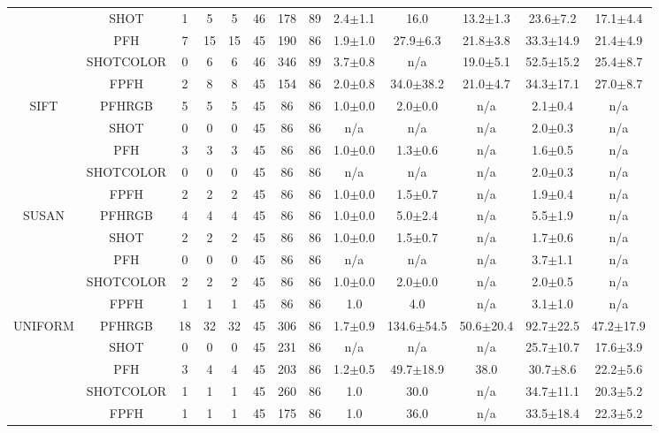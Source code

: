 \documentclass[11pt,a4paper]{kth-mag}
\begin{document}
\begin{landscape}
\begin{table}
\begin{tabular}{cc|ccccccccccc}
      &SHOT & 1 & 5 & 5 & 46 & 178 & 89 & 2.4$\pm$1.1 & 16.0 & 13.2$\pm$1.3 & 23.6$\pm$7.2 & 17.1$\pm$4.4\\
      &PFH & 7 & 15 & 15 & 45 & 190 & 86 & 1.9$\pm$1.0 & 27.9$\pm$6.3 & 21.8$\pm$3.8 & 33.3$\pm$14.9 & 21.4$\pm$4.9\\
      &SHOTCOLOR & 0 & 6 & 6 & 46 & 346 & 89 & 3.7$\pm$0.8 & n/a & 19.0$\pm$5.1 & 52.5$\pm$15.2 & 25.4$\pm$8.7\\
      &FPFH & 2 & 8 & 8 & 45 & 154 & 86 & 2.0$\pm$0.8 & 34.0$\pm$38.2 & 21.0$\pm$4.7 & 34.3$\pm$17.1 & 27.0$\pm$8.7\\
      \hline\multirow{5}{*}{SIFT} & PFHRGB & 5 & 5 & 5 & 45 & 86 & 86 & 1.0$\pm$0.0 & 2.0$\pm$0.0 & n/a & 2.1$\pm$0.4 & n/a\\
      &SHOT & 0 & 0 & 0 & 45 & 86 & 86 & n/a & n/a & n/a & 2.0$\pm$0.3 & n/a\\
      &PFH & 3 & 3 & 3 & 45 & 86 & 86 & 1.0$\pm$0.0 & 1.3$\pm$0.6 & n/a & 1.6$\pm$0.5 & n/a\\
      &SHOTCOLOR & 0 & 0 & 0 & 45 & 86 & 86 & n/a & n/a & n/a & 2.0$\pm$0.3 & n/a\\
      &FPFH & 2 & 2 & 2 & 45 & 86 & 86 & 1.0$\pm$0.0 & 1.5$\pm$0.7 & n/a & 1.9$\pm$0.4 & n/a\\
      \hline\multirow{5}{*}{SUSAN} & PFHRGB & 4 & 4 & 4 & 45 & 86 & 86 & 1.0$\pm$0.0 & 5.0$\pm$2.4 & n/a & 5.5$\pm$1.9 & n/a\\
      &SHOT & 2 & 2 & 2 & 45 & 86 & 86 & 1.0$\pm$0.0 & 1.5$\pm$0.7 & n/a & 1.7$\pm$0.6 & n/a\\
      &PFH & 0 & 0 & 0 & 45 & 86 & 86 & n/a & n/a & n/a & 3.7$\pm$1.1 & n/a\\
      &SHOTCOLOR & 2 & 2 & 2 & 45 & 86 & 86 & 1.0$\pm$0.0 & 2.0$\pm$0.0 & n/a & 2.0$\pm$0.5 & n/a\\
      &FPFH & 1 & 1 & 1 & 45 & 86 & 86 & 1.0 & 4.0 & n/a & 3.1$\pm$1.0 & n/a\\
      \hline\multirow{5}{*}{UNIFORM} & PFHRGB & 18 & 32 & 32 & 45 & 306 & 86 & 1.7$\pm$0.9 & 134.6$\pm$54.5 & 50.6$\pm$20.4 & 92.7$\pm$22.5 & 47.2$\pm$17.9\\
      &SHOT & 0 & 0 & 0 & 45 & 231 & 86 & n/a & n/a & n/a & 25.7$\pm$10.7 & 17.6$\pm$3.9\\
      &PFH & 3 & 4 & 4 & 45 & 203 & 86 & 1.2$\pm$0.5 & 49.7$\pm$18.9 & 38.0 & 30.7$\pm$8.6 & 22.2$\pm$5.6\\
      &SHOTCOLOR & 1 & 1 & 1 & 45 & 260 & 86 & 1.0 & 30.0 & n/a & 34.7$\pm$11.1 & 20.3$\pm$5.2\\
      &FPFH & 1 & 1 & 1 & 45 & 175 & 86 & 1.0 & 36.0 & n/a & 33.5$\pm$18.4 & 22.3$\pm$5.2\\

\end{tabular}
\end{table}
\end{landscape}
\end{document}

